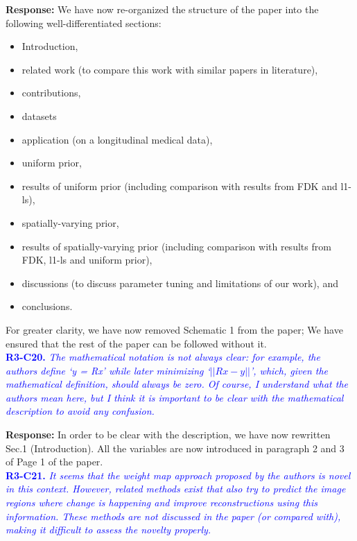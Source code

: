 \documentclass{article}
\begin{document}
\textbf{Response:} We have now re-organized the structure of the paper into the following well-differentiated sections:
\begin{itemize}
  
\item Introduction, 
\item related work (to compare this work with similar papers in literature), 
\item contributions,
\item datasets
\item application (on a longitudinal medical data), 
\item uniform prior, 
\item results of uniform prior (including comparison with results from FDK and l1-ls), 
\item spatially-varying prior, 
\item results of spatially-varying prior (including comparison with results from FDK, l1-ls and uniform prior), 
\item discussions (to discuss parameter tuning and limitations of our work), and 
  \item conclusions.
  \end{itemize}
For greater clarity, we have now removed Schematic 1 from the paper; We have  ensured that the rest of the paper can be followed without it.\\

\textcolor{blue}{\textbf{R3-C20.}\textit{ The mathematical notation is not always clear: for example, the authors define `y = Rx' while later minimizing `$||Rx-y||$', which, given the mathematical definition, should always be zero. Of course, I understand what the authors mean here, but I think it is important to be clear with the mathematical description to avoid any confusion.}}


\textbf{Response:} In order to be clear with the description, we have now rewritten Sec.1 (Introduction). All the variables are now introduced in paragraph 2 and 3 of Page 1 of the paper.\\

\textcolor{blue}{\textbf{R3-C21.}\textit{ It seems that the weight map approach proposed by the authors is novel in this context. However, related methods exist that also try to predict the image regions where change is happening and improve reconstructions using this information. These methods are not discussed in the paper (or compared with), making it difficult to assess the novelty properly.}}
\end{document}
